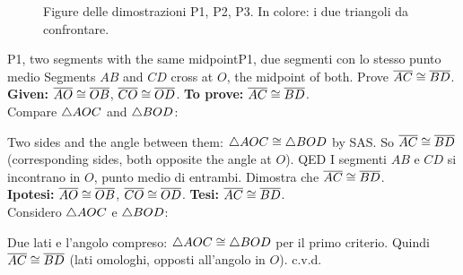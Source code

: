 \begin{figure}[htbp]
%
      {Figure delle dimostrazioni P1, P2, P3. In colore: i due triangoli da confrontare.}
\label{fig:p123}
\end{figure}

\begin{proofbox}{P1, two segments with the same midpoint}{P1, due segmenti con lo stesso punto medio}
Segments $AB$ and $CD$ cross at $O$, the midpoint of both. Prove $\overline{AC} \cong \overline{BD}$.\\
\textbf{Given:} $\overline{AO} \cong \overline{OB}$, $\overline{CO} \cong \overline{OD}$. \textbf{To prove:} $\overline{AC} \cong \overline{BD}$.\\
Compare $\triangle AOC$ and $\triangle BOD$:
\begin{steps}
\end{steps}
Two sides and the angle between them: $\triangle AOC \cong \triangle BOD$ by SAS. So $\overline{AC} \cong \overline{BD}$ (corresponding sides, both opposite the angle at $O$). \hfill QED
\tcblower
I segmenti $AB$ e $CD$ si incontrano in $O$, punto medio di entrambi. Dimostra che $\overline{AC} \cong \overline{BD}$.\\
\textbf{Ipotesi:} $\overline{AO} \cong \overline{OB}$, $\overline{CO} \cong \overline{OD}$. \textbf{Tesi:} $\overline{AC} \cong \overline{BD}$.\\
Considero $\triangle AOC$ e $\triangle BOD$:
\begin{steps}
\end{steps}
Due lati e l'angolo compreso: $\triangle AOC \cong \triangle BOD$ per il primo criterio. Quindi $\overline{AC} \cong \overline{BD}$ (lati omologhi, opposti all'angolo in $O$). \hfill c.v.d.
\end{proofbox}

